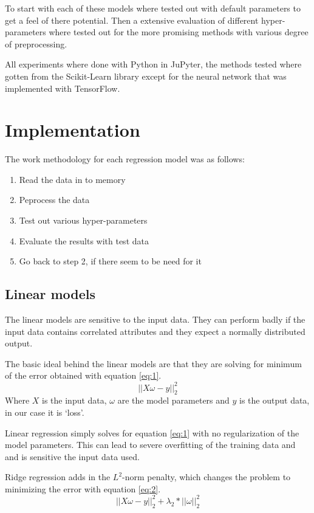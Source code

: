 \documentclass[a4paper]{article}
\begin{document}
To start with each of these models where tested out with default parameters to get a feel of there potential. Then a extensive evaluation of different hyper-parameters where tested out for the more promising methods with various degree of preprocessing.

All experiments where done with Python in JuPyter, the methods tested where gotten from the Scikit-Learn library except for the neural network that was implemented with TensorFlow.


\section{Implementation}

The work methodology for each regression model was as follows:
\begin{enumerate}
  \item Read the data in to memory
  \item Peprocess the data
  \item Test out various hyper-parameters
  \item Evaluate the results with test data
  \item Go back to step 2, if there seem to be need for it
\end{enumerate}

\subsection{Linear models}
The linear models are sensitive to the input data. They can perform badly if the input data contains correlated attributes and they expect a normally distributed output.

The basic ideal behind the linear models are that they are solving for minimum of the error obtained with equation \ref{eq:1}.
\begin{equation} \label{eq:1}
||X\omega - y||_2^2
\end{equation}
Where $X$ is the input data, $\omega$ are the model parameters and $y$ is the output data, in our case it is ‘loss’.

Linear regression simply solves for equation \ref{eq:1} with no regularization of the model parameters. This can lead to severe overfitting of the training data and and is sensitive the input data used.

Ridge regression adds in the $L^2$-norm penalty, which changes the problem to minimizing the error with equation \ref{eq:2}.
\begin{equation} \label{eq:2}
||X\omega - y||_2^2 + \lambda_2*||\omega||_2^2
\end{equation}
\end{document}

